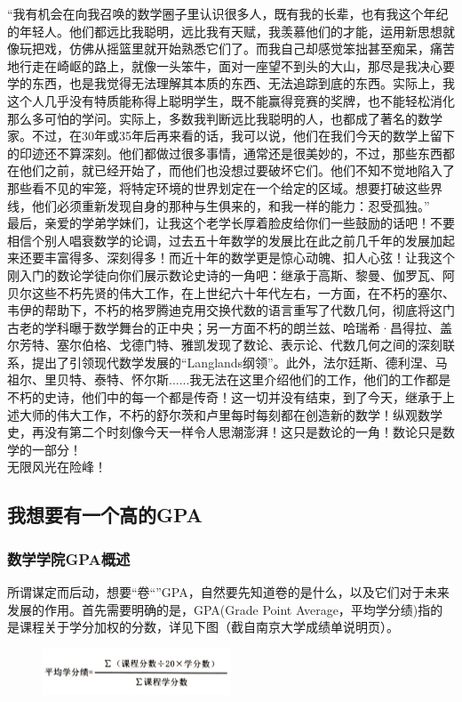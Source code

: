 \documentclass[a4paper,11pt,notitlepage]{article}
\begin{document}
\indent “我有机会在向我召唤的数学圈子里认识很多人，既有我的长辈，也有我这个年纪的年轻人。他们都远比我聪明，远比我有天赋，我羡慕他们的才能，运用新思想就像玩把戏，仿佛从摇篮里就开始熟悉它们了。而我自己却感觉笨拙甚至痴呆，痛苦地行走在崎岖的路上，就像一头笨牛，面对一座望不到头的大山，那尽是我决心要学的东西，也是我觉得无法理解其本质的东西、无法追踪到底的东西。实际上，我这个人几乎没有特质能称得上聪明学生，既不能赢得竞赛的奖牌，也不能轻松消化那么多可怕的学问。实际上，多数我判断远比我聪明的人，也都成了著名的数学家。不过，在30年或35年后再来看的话，我可以说，他们在我们今天的数学上留下的印迹还不算深刻。他们都做过很多事情，通常还是很美妙的，不过，那些东西都在他们之前，就已经开始了，而他们也没想过要破坏它们。他们不知不觉地陷入了那些看不见的牢笼，将特定环境的世界划定在一个给定的区域。想要打破这些界线，他们必须重新发现自身的那种与生俱来的，和我一样的能力：忍受孤独。”\\
\indent 最后，亲爱的学弟学妹们，让我这个老学长厚着脸皮给你们一些鼓励的话吧！不要相信个别人唱衰数学的论调，过去五十年数学的发展比在此之前几千年的发展加起来还要丰富得多、深刻得多！而近十年的数学更是惊心动魄、扣人心弦！让我这个刚入门的数论学徒向你们展示数论史诗的一角吧：继承于高斯、黎曼、伽罗瓦、阿贝尔这些不朽先贤的伟大工作，在上世纪六十年代左右，一方面，在不朽的塞尔、韦伊的帮助下，不朽的格罗腾迪克用交换代数的语言重写了代数几何，彻底将这门古老的学科曝于数学舞台的正中央；另一方面不朽的朗兰兹、哈瑞希·昌得拉、盖尔芳特、塞尔伯格、戈德门特、雅凯发现了数论、表示论、代数几何之间的深刻联系，提出了引领现代数学发展的“Langlands纲领”。此外，法尔廷斯、德利涅、马祖尔、里贝特、泰特、怀尔斯......我无法在这里介绍他们的工作，他们的工作都是不朽的史诗，他们中的每一个都是传奇！这一切并没有结束，到了今天，继承于上述大师的伟大工作，不朽的舒尔茨和卢里每时每刻都在创造新的数学！纵观数学史，再没有第二个时刻像今天一样令人思潮澎湃！这只是数论的一角！数论只是数学的一部分！\\
\indent 无限风光在险峰！


\subsection{我想要有一个高的GPA}
\subsubsection{数学学院GPA概述}\label{数学学院GPA概述}
所谓谋定而后动，想要“卷“”GPA，自然要先知道卷的是什么，以及它们对于未来发展的作用。首先需要明确的是，GPA(Grade Point Average，平均学分绩)指的是课程关于学分加权的分数，详见下图（截自南京大学成绩单说明页）。\\
\begin{figure}[ht]
\centering
\includegraphics[width=0.5\textwidth]{GPA说明.png}
\end{figure}
\end{document}

